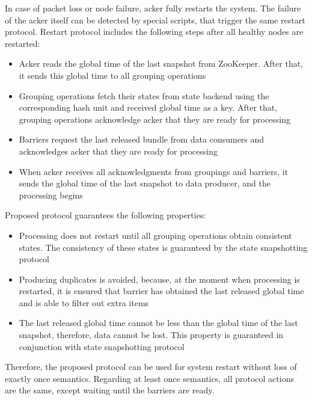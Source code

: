 In case of packet loss or node failure, acker fully restarts the system. The failure of the acker itself can be detected by special scripts, that trigger the same restart protocol. Restart protocol includes the following steps after all healthy nodes are restarted:

\begin{itemize}
    \item Acker reads the global time of the last snapshot from ZooKeeper. After that, it sends this global time to all grouping operations
    \item Grouping operations fetch their states from state backend using the corresponding hash unit and received global time as a key. After that, grouping operations acknowledge acker that they are ready for processing 
    \item Barriers request the last released bundle from data consumers and acknowledges acker that they are ready for processing
    \item When acker receives all acknowledgments from groupings and barriers, it sends the global time of the last snapshot to data producer, and the processing begins 
\end{itemize}

Proposed protocol guarantees the following properties:

\begin{itemize}
    \item Processing does not restart until all grouping operations obtain consistent states. The consistency of these states is guaranteed by the state snapshotting protocol
    \item Producing duplicates is avoided, because, at the moment when processing is restarted, it is ensured that barrier has obtained the last released global time and is able to filter out extra items
    \item The last released global time cannot be less than the global time of the last snapshot, therefore, data cannot be lost. This property is guaranteed in conjunction with state snapshotting protocol
\end{itemize}

Therefore, the proposed protocol can be used for system restart without loss of exactly once semantics. Regarding at least once semantics, all protocol actions are the same, except waiting until the barriers are ready.